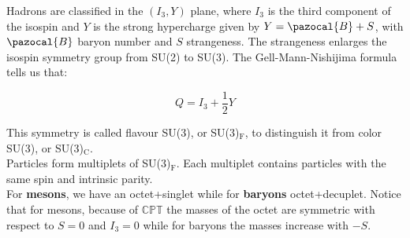 \documentclass[10.75pt,a4paper,openright,bottom=2cm]{article}
\begin{document}
Hadrons are classified in the $(I_3,Y)$ plane, where $I_3$ is the third component of the isospin and $Y$ is the strong hypercharge given by $Y=\pazocal{B}+S$, with $\pazocal{B}$ baryon number and $S$ strangeness. The strangeness enlarges the isospin symmetry group from SU(2) to SU(3). The Gell-Mann-Nishijima formula tells us that:
\begin{tcolorbox}[width=\textwidth,colback={yellow!50},title={Gell-Mann-Nishijima Formula},colbacktitle={gray!50},coltitle=black]
\[
Q=I_3+\frac{1}{2}Y
\]
\end{tcolorbox}
\noindent
This symmetry is called flavour SU(3), or SU(3)$_\text{F}$, to distinguish it from color SU(3), or SU(3)$_\text{C}$.\\
Particles form multiplets of SU(3)$_\text{F}$. Each multiplet contains particles with the same spin and intrinsic parity.\\
For \textbf{mesons}, we have an octet+singlet while for \textbf{baryons} octet+decuplet. Notice that for mesons, because of $\mathbb{CPT}$ the masses of the octet are symmetric with respect to $S=0$ and $I_3=0$ while for baryons the masses increase with $-S$.\\
\end{document}
